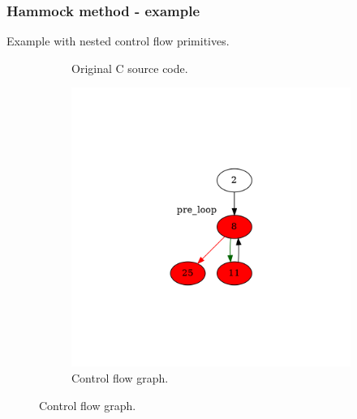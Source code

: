 \documentclass[aspectratio=1610]{beamer}
\begin{document}
\begin{frame}[noframenumbering]
	\frametitle{Hammock method - example}
	Example with nested control flow primitives.
	\begin{figure}[htbp]
		\centering
		\begin{subfigure}[b]{0.30\textwidth}
			\centering
			
			\caption{Original C source code.}
		\end{subfigure}
		\begin{subfigure}[b]{0.50\textwidth}
			\centering
			\includegraphics[height=0.6\paperheight]{inc/methods/hammock/example/without-break/main_0003a.png}
			\caption{Control flow graph.}
		\end{subfigure}
	\end{figure}
\end{frame}
\end{document}
